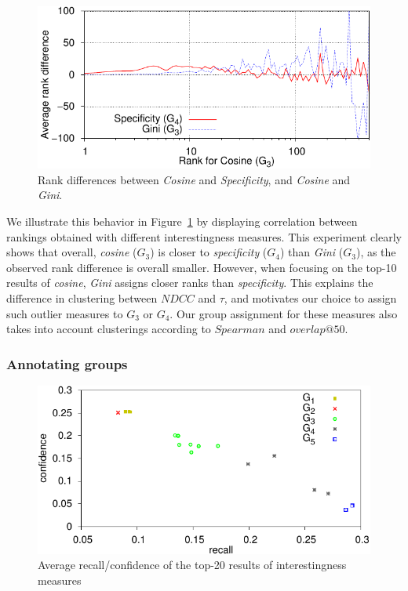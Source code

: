 \pagebreak

\begin{figure}[th!]
  \begin{center}
  \includegraphics{fig/capa/rank-correlation.pdf}
  \caption{Rank differences between {\em Cosine} and {\em Specificity},
    and {\em Cosine} and {\em Gini}.
    \label{fig:rankcorrelation}}
  \end{center}
\end{figure}

We illustrate this behavior in Figure~\ref{fig:rankcorrelation}
by displaying correlation between rankings obtained with different interestingness measures.
This experiment clearly shows that overall, {\em cosine} ($G_3$) is closer to {\em specificity}
($G_4$) than {\em Gini} ($G_3$), as the observed rank difference is overall smaller.
However, when focusing on the top-10 results of {\em cosine},
{\em Gini} assigns closer ranks than {\em specificity}.
This explains the difference in clustering between $\mathit{NDCC}$ and $\tau$,
and motivates our choice to assign such outlier measures to $G_3$ or $G_4$.
Our group assignment for these measures also takes into account clusterings according to
$\mathit{Spearman}$ and $\mathit{overlap}@50$.

\subsubsection{Annotating groups}
\label{sec:annotation}

\begin{figure}
  \centering
  \includegraphics{fig/capa/recall_precision}
  \caption{Average recall/confidence of the top-20 results of interestingness measures
    \label{fig:recallprecision}
  }
\end{figure}


